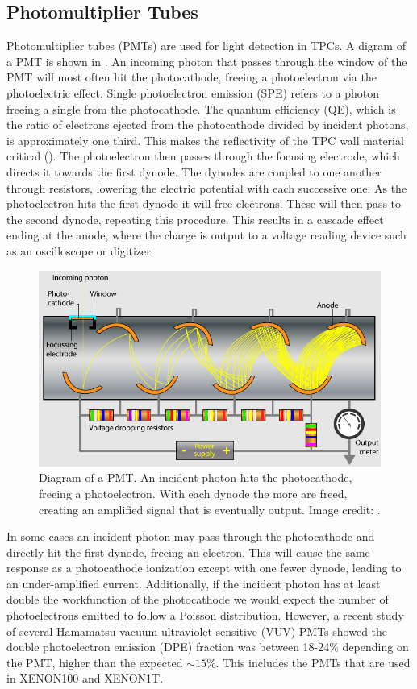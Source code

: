 {\subsection{Photomultiplier Tubes}
\label{subsec:tpcs_pmts}
Photomultiplier tubes (PMTs) are used for light detection in TPCs.  A digram of a PMT is shown in .  An
incoming photon that
passes through the window of the PMT will most often hit the photocathode, freeing a photoelectron via the photoelectric effect.  Single
photoelectron emission (SPE) refers to a photon freeing a single \electron from the photocathode.  The
quantum efficiency (QE), which is the ratio of electrons ejected from the photocathode divided by incident photons, is approximately
one third.  This
makes the reflectivity of the TPC wall material critical ().  The photoelectron then passes through the focusing
electrode, which directs it towards the first dynode.  The dynodes are coupled to one another through resistors, lowering the electric
potential with each successive one.  As the photoelectron hits the first dynode it will free electrons.  These will then pass to the
second dynode, repeating this procedure.  This results in a cascade effect ending at the anode, where the charge is output to a
voltage reading device such as an oscilloscope or digitizer.

\begin{figure}
\includegraphics[width=\textwidth]{PMT1}
\caption{Diagram of a PMT.  An incident photon hits the photocathode, freeing a photoelectron.  With each dynode the more \electron are
freed, creating an amplified signal that is eventually output.  Image credit: .}
\label{fig:tpcs_pmts_pmt_diagram}
\end{figure}

In some cases an incident photon may pass through the photocathode and directly hit the first dynode, freeing an electron.  This will
cause the same response as a photocathode ionization except with one fewer dynode, leading to an under-amplified current.  Additionally,
if the incident photon has at least double the workfunction of the photocathode we would expect the number of photoelectrons emitted to
follow a Poisson distribution.  However, a recent study of several Hamamatsu vacuum ultraviolet-sensitive (VUV) PMTs showed the double
photoelectron emission
(DPE) fraction was between 18-24\% depending on the PMT, higher than the expected $\sim 15\%$.  This includes the PMTs that are used in
XENON100 and XENON1T.

}
